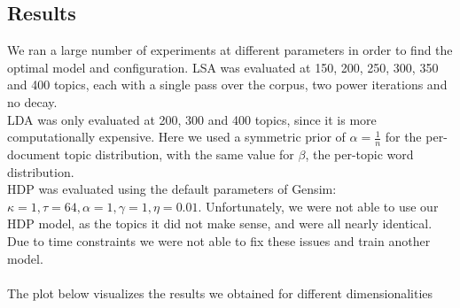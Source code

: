 \subsection{Results}
We ran a large number of experiments at different parameters in order to find the optimal model and configuration. LSA was evaluated at 150, 200, 250, 300, 350 and 400 topics, each with a single pass over the corpus, two power iterations and no decay.\\ 
LDA was only evaluated at 200, 300 and 400 topics, since it is more computationally expensive. Here we used a symmetric prior of $\alpha = \frac{1}{n}$ for the per-document topic distribution, with the same value for $\beta$, the per-topic word distribution.\\
HDP was evaluated using the default parameters of Gensim: $\kappa = 1, \tau = 64, \alpha =1, \gamma =1, \eta =0.01$. Unfortunately, we were not able to use our HDP model, as the topics it did not make sense, and were all nearly identical. Due to time constraints we were not able to fix these issues and train another model.\\\\
The plot below visualizes the results we obtained for different dimensionalities 


